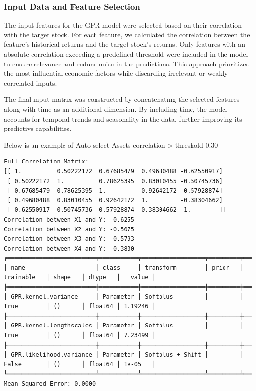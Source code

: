 \subsubsection{Input Data and Feature Selection}

The input features for the GPR model were selected based on their correlation with the target stock. For each feature, we calculated the correlation between the feature's historical returns and the target stock's returns. Only features with an absolute correlation exceeding a predefined threshold were included in the model to ensure relevance and reduce noise in the predictions. This approach prioritizes the most influential economic factors while discarding irrelevant or weakly correlated inputs.

The final input matrix was constructed by concatenating the selected features along with time as an additional dimension. By including time, the model accounts for temporal trends and seasonality in the data, further improving its predictive capabilities.

Below is an example of Auto-select Assets correlation > threshold 0.30

\begin{lstlisting}[language=shell]
Full Correlation Matrix:
[[ 1.          0.50222172  0.67685479  0.49680488 -0.62550917]
 [ 0.50222172  1.          0.78625395  0.83010455 -0.50745736]
 [ 0.67685479  0.78625395  1.          0.92642172 -0.57928874]
 [ 0.49680488  0.83010455  0.92642172  1.         -0.38304662]
 [-0.62550917 -0.50745736 -0.57928874 -0.38304662  1.        ]]
Correlation between X1 and Y: -0.6255
Correlation between X2 and Y: -0.5075
Correlation between X3 and Y: -0.5793
Correlation between X4 and Y: -0.3830
╒═════════════════════════╤═══════════╤══════════════════╤═════════╤═════════════╤═════════╤═════════╤═════════╕
│ name                    │ class     │ transform        │ prior   │ trainable   │ shape   │ dtype   │   value │
╞═════════════════════════╪═══════════╪══════════════════╪═════════╪═════════════╪═════════╪═════════╪═════════╡
│ GPR.kernel.variance     │ Parameter │ Softplus         │         │ True        │ ()      │ float64 │ 1.19246 │
├─────────────────────────┼───────────┼──────────────────┼─────────┼─────────────┼─────────┼─────────┼─────────┤
│ GPR.kernel.lengthscales │ Parameter │ Softplus         │         │ True        │ ()      │ float64 │ 7.23499 │
├─────────────────────────┼───────────┼──────────────────┼─────────┼─────────────┼─────────┼─────────┼─────────┤
│ GPR.likelihood.variance │ Parameter │ Softplus + Shift │         │ False       │ ()      │ float64 │ 1e-05   │
╘═════════════════════════╧═══════════╧══════════════════╧═════════╧═════════════╧═════════╧═════════╧═════════╛
Mean Squared Error: 0.0000

\end{lstlisting}

